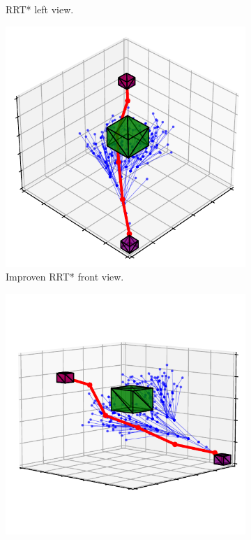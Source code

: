 \documentclass{ctuthesis}
\begin{document}
\begin{figure}[!ht]
\begin{subfigure}[b]{0.49\textwidth}
      \caption{RRT* left view.}
      \label{fig:rrtstarML3D_maze_left}
  \end{subfigure}
  \begin{subfigure}[b]{0.49\textwidth}
    \includegraphics[width=\textwidth]{figChap4/6D_RRTstarML193it_loc_m135to35.pdf}
    \caption{Improven RRT* front view.}
    \label{fig:rrtstarML3D_maze_right}
  \end{subfigure}
  \begin{subfigure}[b]{0.49\textwidth}
    \includegraphics[width=\textwidth]{figChap4/6D_RRTstarML193it_loc_135to10.pdf}

\end{subfigure}
\end{figure}
\end{document}
